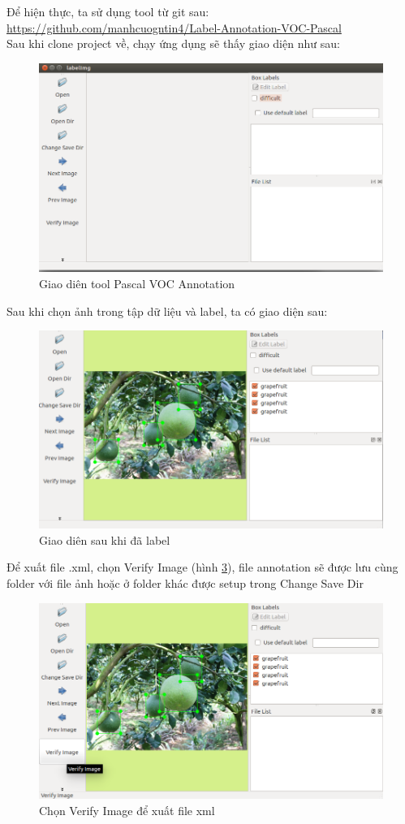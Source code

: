 Để hiện thực, ta sử dụng tool từ git sau:\\
\url{https://github.com/manhcuogntin4/Label-Annotation-VOC-Pascal} \\
Sau khi clone project về, chạy ứng dụng sẽ thấy giao diện như sau:
	\begin{center}
    	\begin{figure}[H]
    	\centering
    	\includegraphics[width=0.7\columnwidth]{images/chap3/UI1.png}
    	\caption{Giao diên tool Pascal VOC Annotation}
    	\label{fig:my_label}
    	\end{figure}
	\end{center}
Sau khi chọn ảnh trong tập dữ liệu và label, ta có giao diện sau:
	\begin{center}
    	\begin{figure}[H]
    	\centering
    	\includegraphics[width=0.7\columnwidth]{images/chap3/UI2.png}
    	\caption{Giao diên sau khi đã label}
    	\label{fig:my_label}
    	\end{figure}
	\end{center}
Để xuất file .xml, chọn Verify Image (hình \ref{chap3:verify}), file annotation sẽ được lưu cùng folder với file ảnh hoặc ở folder khác được setup trong Change Save Dir
	\begin{center}
    	\begin{figure}[H]
    	\centering
    	\includegraphics[width=0.7\columnwidth]{images/chap3/UI3.png}
    	\caption{Chọn Verify Image để xuất file xml}
    	\label{chap3:verify}
    	\end{figure}
	\end{center}

